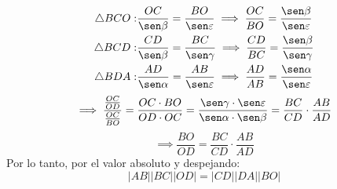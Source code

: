\begin{problema}
\begin{dem}
\begin{align*}
	\triangle BCO: & \frac{OC}{\sen \beta}=\frac{BO}{\sen \varepsilon}\implies \frac{OC}{BO}=\frac{\sen \beta}{\sen \varepsilon}\\
	\triangle BCD: & \frac{CD}{\sen\beta}=\frac{BC}{\sen \gamma}\implies \frac{CD}{BC}=\frac{\sen \beta }{\sen \gamma}\\
	\triangle BDA: & \frac{AD}{\sen \alpha}=\frac{AB}{\sen\varepsilon}\implies \frac{AD}{AB}=\frac{\sen \alpha}{\sen\varepsilon}\\
\end{align*}
$$\implies \frac{\frac{OC}{OD}}{\frac{OC}{BO}}=\frac{OC\cdot BO}{OD\cdot OC}=\frac{\sen \gamma \cdot \sen \varepsilon}{\sen \alpha \cdot \sen \beta}=\frac{BC}{CD}\cdot \frac{AB}{AD}$$
$$\implies \frac{BO}{OD}=\frac{BC}{CD}\cdot \frac{AB}{AD}$$
Por lo tanto, por el valor absoluto y despejando: 
	$$
|A B||B C||O D|=|C D||D A||B O|
$$
	\end{dem}
\end{problema}


